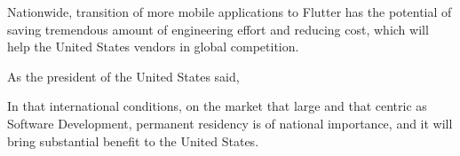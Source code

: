 Nationwide, transition of more mobile applications to Flutter has the potential of saving tremendous amount
of engineering effort and reducing cost, which will help the United States vendors in global competition.

As the president of the United States said,


In that international conditions,
on the market that large and that centric as Software Development,
\mrls permanent residency is of national importance,
and it will bring substantial benefit to the United States.

\pagebreak
